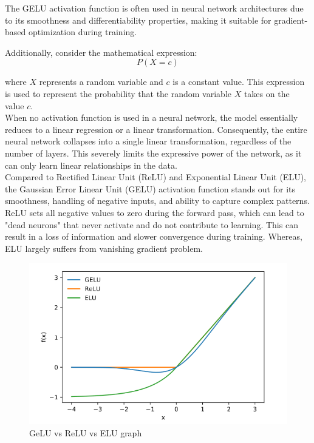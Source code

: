 The GELU activation function is often used in neural network architectures due to its smoothness and differentiability properties, making it suitable for gradient-based optimization during training.

Additionally, consider the mathematical expression:
\begin{equation}
    P(X = c) \label{eq:probability}
\end{equation}

where $X$ represents a random variable and $c$ is a constant value. This expression is used to represent the probability that the random variable $X$ takes on the value $c$.\\

When no activation function is used in a neural network, the model essentially reduces to a linear regression or a linear transformation. Consequently, the entire neural network collapses into a single linear transformation, regardless of the number of layers. This severely limits the expressive power of the network, as it can only learn linear relationships in the data.\\

Compared to Rectified Linear Unit (ReLU) and Exponential Linear Unit (ELU), the Gaussian Error Linear Unit (GELU) activation function stands out for its smoothness, handling of negative inputs, and ability to capture complex patterns. ReLU sets all negative values to zero during the forward pass, which can lead to "dead neurons" that never activate and do not contribute to learning. This can result in a loss of information and slower convergence during training. Whereas, ELU largely suffers from vanishing gradient problem.

\begin{figure}[htbp]
    \centering
    \includegraphics[width=6in]{img/gelu vs relu.png}
    \caption{{GeLU vs ReLU vs ELU graph}}
\end{figure}


